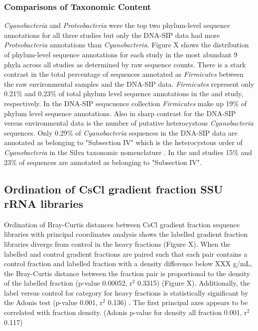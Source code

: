\subsubsection{Comparisons of Taxonomic Content} 
\textit{Cyanobacteria} and \textit{Proteobacteria} were the top two phylum-level sequence annotations for all three studies but only the DNA-SIP data had more \textit{Proteobacteria} annotations than \textit{Cyanobacteria}. Figure X shows the distribution of phylum-level sequence annotations for each study in the most abundant 9 phyla across all studies as determined by raw sequence counts. There is a stark contrast in the total percentage of sequences annotated as \textit{Firmicutes} between the raw environmental samples and the DNA-SIP data. \textit{Firmicutes} represent only 0.21\% and 0.23\% of total phylum level sequence annotations in the \citet{Steven_2013} and \citet{Garcia_Pichel_2013} study, respectively. In the DNA-SIP sequcuence collection \textit{Firmicutes} make up 19\% of phylum level sequence annotations. Also in sharp contrast for the DNA-SIP versus environmental data is the number of putative heterocystous \textit{Cyanobacteria} sequences. Only 0.29\% of \textit{Cyanobacteria} sequences in the DNA-SIP data are annotated as belonging to "Subsection IV" which is the heterocystous order of \textit{Cyanobacteria} in the Silva taxonomic nomenclature \cite{17947321}. In the \citet{Steven_2013} and \citet{Garcia_Pichel_2013} studies 15\% and 23\% of  sequences are annotated as belonging to "Subsection IV".  

\subsection{Ordination of CsCl gradient fraction SSU rRNA libraries}
Ordination of Bray-Curtis \cite{Bray_1957} distances between CsCl gradient fraction sequence libraries with principal coordinates analysis shows the labelled gradient fraction libraries diverge from control in the heavy fractions (Figure X). When the labelled and control gradient fractions are paired such that each pair contains a control fraction and labelled fraction with a density difference below XXX g/mL, the Bray-Curtis distance between the fraction pair is proportional to the density of the labelled fraction (p-value 0.00052, r$^{2}$ 0.3315) (Figure X). Additionally, the label versus control for category for heavy fractions is statistically significant by the Adonis test (p-value 0.001, r$^{2}$ 0.136) \cite{Anderson_2001}. The first principal axes appears to be correlated with fraction density. (Adonis p-value for density all fraction 0.001, r$^{2}$ 0.117)

